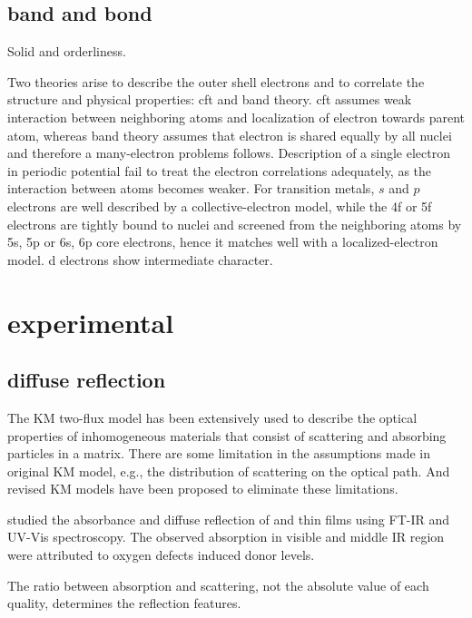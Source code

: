 \section{band and bond}

Solid and orderliness.

Two theories arise to describe the outer shell electrons and to correlate the structure and physical properties: \gls{cft} and band theory.\cite{Goodenough1971} \gls{cft} assumes weak interaction between neighboring atoms and localization of electron towards parent atom, whereas band theory assumes that electron is shared equally by all nuclei and therefore a many-electron problems follows. Description of a single electron in periodic potential fail to treat the electron correlations adequately, as the interaction between atoms becomes weaker. For transition metals, $s$ and $p$ electrons are well described by a collective-electron model, while the 4f or 5f electrons are tightly bound to nuclei and screened from the neighboring atoms by 5s, 5p or 6s, 6p core electrons, hence it matches well with a localized-electron model. d electrons show intermediate character.


\chapter{experimental}

\section{diffuse reflection}

The KM two-flux model has been extensively used to describe the optical properties of inhomogeneous materials that consist of scattering and absorbing particles in a matrix.\cite{Vargas1997} There are some limitation in the assumptions made in original KM model, e.g., the distribution of scattering on the optical path. And revised KM models have been proposed to eliminate these limitations.\cite{Yang2004}  

\citeauthor{Morandi2005} studied the absorbance and diffuse reflection of  and  thin films using FT-IR and UV-Vis spectroscopy. The observed absorption in visible and middle IR region were attributed to oxygen defects induced donor levels.\cite{Morandi2005}

The ratio between absorption and scattering, not the absolute value of each quality, determines the reflection features.


\iffalse

